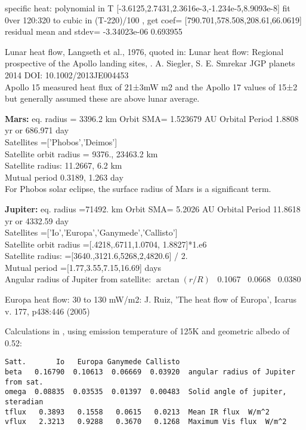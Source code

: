 \documentclass{article}
\begin{document}
specific heat: polynomial in T [-3.6125,2.7431,2.3616e-3,-1.234e-5,8.9093e-8]
\qi fit 0ver 120:320 to cubic in (T-220)/100 , get coef= [790.701,578.508,208.61,66.0619]
\qi residual mean and stdev= -3.34023e-06     0.693955

Lunar heat flow, Langseth et al., 1976, quoted in:
\qi  Lunar heat flow: Regional prospective of the Apollo landing sites, 
\qii . A. Siegler, S. E. Smrekar  JGP planets 2014 DOI: 10.1002/2013JE004453
\\ Apollo 15 measured heat flux of 21±3mW m2 and the Apollo 17 values of 15±2
\qi but generally assumed these are above lunar average.

\textbf{Mars:} eq. radius = 3396.2 km
\qi Orbit SMA= 1.523679 AU
\qi Orbital Period 1.8808 yr or 686.971 day
\\ Satellites =['Phobos','Deimos']
\\ Satellite orbit radius = 9376.,  23463.2 km
\\ Satellite radius: 11.2667, 6.2   km 
\\ Mutual period  0.3189, 1.263   day
\\ For Phobos solar eclipse, the surface radius of Mars is a significant term.

\textbf{Jupiter:} eq. radius =71492. km
\qi Orbit SMA= 5.2026 AU
\qi Orbital Period 11.8618 yr or 4332.59 day
\\ Satellites =['Io','Europa','Ganymede','Callisto']
\\ Satellite orbit radius =[.4218,.6711,1.0704, 1.8827]*1.e6
\\ Satellite radius: =[3640.,3121.6,5268,2,4820.6] / 2.
\\ Mutual period =[1.77,3.55,7.15,16.69] days
\\ Angular radius of Jupiter from satellite: $\arctan(r/R)$
  \   0.1067 \   0.0668  \  0.0380

Europa heat flow: 30 to 130 mW/m2: J. Ruiz, 'The heat flow of Europa', Icarus v. 177, p438:446 (2005) 

Calculations in , using emission temperature of 125K and 
geometric albedo of 0.52:
\vspace{-3.mm} 
\begin{verbatim}
Satt.       Io   Europa Ganymede Callisto 
beta   0.16790  0.10613  0.06669  0.03920  angular radius of Jupiter from sat.
omega  0.08835  0.03535  0.01397  0.00483  Solid angle of jupiter, steradian
tflux   0.3893   0.1558   0.0615   0.0213  Mean IR flux  W/m^2
vflux   2.3213   0.9288   0.3670   0.1268  Maximum Vis flux  W/m^2
\end{verbatim}
\end{document}
